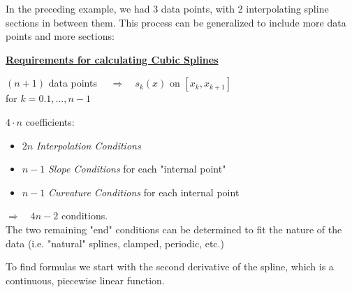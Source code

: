 \documentclass[a4paper,12pt,]{report}
\begin{document}

\pagebreak
	In the preceding example, we had 3 data points, with 2 interpolating spline sections in between them.  This process can be generalized to include 
	more data points and more sections:

	\begin{center}
	\fbox
	{
		\parbox{0.8\textwidth}
		{
		\noindent \textbf{\underline{Requirements for calculating Cubic Splines}}
			\begin{center}
				$(n+1)$ data points $\quad \Rightarrow \quad s_k(x)$ on $[x_k, x_{k+1}]$\\
				\medskip
				for $k = 0. 1, ..., n\!-\!1$
			\end{center}
			\noindent $4\cdot n$ coefficients:
			\begin{itemize}
				\item $2n$ \textit{Interpolation Conditions}
				\item $n-1$ \textit{Slope Conditions} for each "internal point"
				\item $n-1$ \textit{Curvature Conditions} for each internal point
			\end{itemize}
			$\Rightarrow \quad 4n - 2$ conditions.\\

			The two remaining "end" conditions can be determined to fit the nature of the data (i.e. "natural" splines, clamped, periodic, etc.)
		}
	}
	\end{center}
	\bigskip

	To find formulas we start with the second derivative of the spline, which is a continuous, piecewise linear function.
\end{document}
